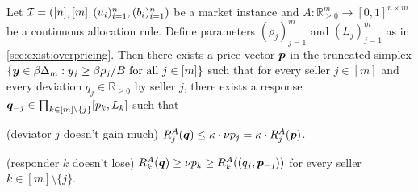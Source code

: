 \begin{theorem}
\label{thm:rare-exists-continuous}
Let $\mathcal{I} = ([n], [m], (u_i)_{i=1}^n, (b_i)_{i=1}^n)$ be a market instance
and $A: \mathbb{R}_{\ge 0}^m \to [0, 1]^{n \times m}$ be a continuous allocation rule.
Define parameters $(\rho_j)_{j=1}^m$ and $(L_j)_{j=1}^m$ as in \cref{sec:exist:overpricing}.
%
Then there exists a price vector $\bm{p}$ in the truncated simplex
$\{\bm{y} \in \beta\Delta_m: y_j \ge \beta\rho_j/B \text{ for all } j \in [m]\}$
such that for every seller $j \in [m]$ and every deviation $q_j \in \mathbb{R}_{\ge 0}$ by seller $j$,
there exists a response $\bm{q}_{-j} \in \prod_{k \in [m]\setminus\{j\}} [p_k, L_k]$ such that
\begin{tightenum}
\item (deviator $j$ doesn't gain much) $R_j^A(\bm{q}) \le \kappa \cdot \nu p_j = \kappa \cdot R_j^A(\bm{p})$.
\item (responder $k$ doesn't lose) $R_k^A(\bm{q}) \ge \nu p_k \ge R_k^A((q_j, \bm{p}_{-j}))$
    for every seller $k \in [m] \setminus \{j\}$.
\end{tightenum}
\end{theorem}
